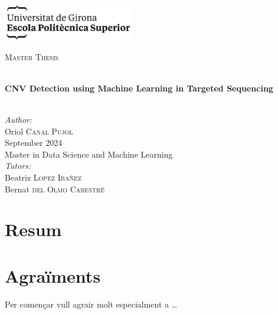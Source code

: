 \documentclass[a4paper,12pt,twoside]{ThesisStyle}
\begin{document}
\newpage
\hypersetup{pageanchor=false}
\begin{titlepage}

\includegraphics[scale=0.9]{imatges/logo_eps.png} \\[1cm]
\begin{center}
\textsc{\Large Master Thesis} \\[1cm]

\begin{spacing}{2}
\HRule \\
\textbf{\Huge CNV Detection using Machine Learning in Targeted Sequencing} \\
\HRule \\[0.5cm]
\end{spacing}

{
\large
\emph{Author:} \\
Oriol \textsc{Canal Pujol} \\[1cm]
September 2024 \\[1cm]
Master in Data Science and Machine Learning \\[1cm]
\emph{Tutors:} \\
Beatriz \textsc{Lopez Ibañez} \\
Bernat \textsc{del Olmo Cabestré} \\
}

\end{center}
\end{titlepage}
\hypersetup{pageanchor=true}

\titlepage




\chapter*{Resum}



\chapter*{Agraïments}

Per començar vull agrair molt especialment a \ldots


\tableofcontents
\end{document}
